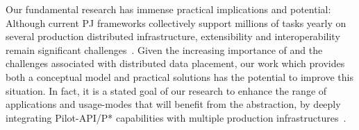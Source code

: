 \documentclass[conference]{IEEEtran}
\begin{document}
Our fundamental research has immense practical implications and
potential: Although current PJ frameworks collectively support
millions of tasks yearly on several production distributed
infrastructure, extensibility and interoperability remain significant
challenges~\cite{extenci}.  Given the increasing importance of
\pilotjobs and the challenges associated with distributed data
placement, our work which provides both a conceptual model and
practical solutions has the potential to improve this situation.  In
fact, it is a stated goal of our research to enhance the range of
applications and usage-modes that will benefit from the \pilot
abstraction, by deeply integrating Pilot-API/P* capabilities with
multiple production infrastructures~\cite{bigjob_web}.








\end{document}
